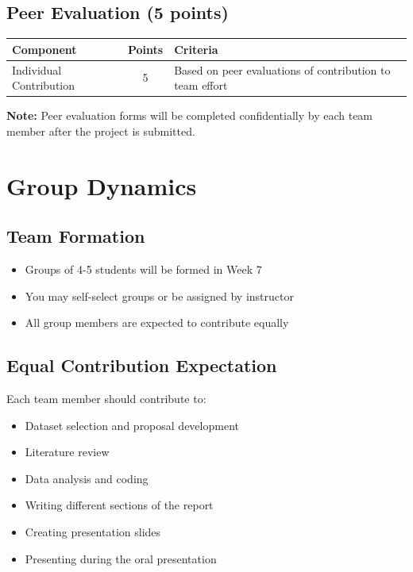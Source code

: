 \documentclass[11pt]{article}
\begin{document}
\subsection{Peer Evaluation (5 points)}

\begin{table}[h]
\centering
\begin{tabular}{p{5cm}cp{7cm}}
\toprule
\textbf{Component} & \textbf{Points} & \textbf{Criteria} \\
\midrule
Individual Contribution & 5 & Based on peer evaluations of contribution to team effort \\
\bottomrule
\end{tabular}
\end{table}

\textbf{Note:} Peer evaluation forms will be completed confidentially by each team member after the project is submitted.

\section{Group Dynamics}

\subsection{Team Formation}

\begin{itemize}
\item Groups of 4-5 students will be formed in Week 7
\item You may self-select groups or be assigned by instructor
\item All group members are expected to contribute equally
\end{itemize}

\subsection{Equal Contribution Expectation}

Each team member should contribute to:
\begin{itemize}
\item Dataset selection and proposal development
\item Literature review
\item Data analysis and coding
\item Writing different sections of the report
\item Creating presentation slides
\item Presenting during the oral presentation
\end{itemize}
\end{document}
